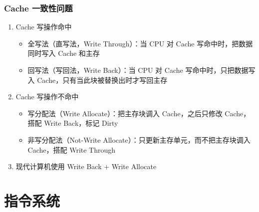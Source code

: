 \documentclass[a4paper,12pt]{article}
\begin{document}
    \subsubsection{Cache 一致性问题}

    \begin{enumerate}
        \item Cache 写操作命中
        \begin{itemize}
            \item 全写法（直写法，Write Through）：当 CPU 对 Cache 写命中时，把数据同时写入 Cache 和主存
            \item 回写法（写回法，Write Back）：当 CPU 对 Cache 写命中时，只把数据写入 Cache，只有当此块被替换出时才写回主存
        \end{itemize}
        \item Cache 写操作不命中
        \begin{itemize}
            \item 写分配法（Write Allocate）：把主存块调入 Cache，之后只修改 Cache，搭配 Write Back，标记 Dirty
            \item 非写分配法（Not-Write Allocate）：只更新主存单元，而不把主存块调入 Cache，搭配 Write Through
        \end{itemize}
        \item 现代计算机使用 Write Back + Write Allocate
    \end{enumerate}


    \section{指令系统}
\end{document}
